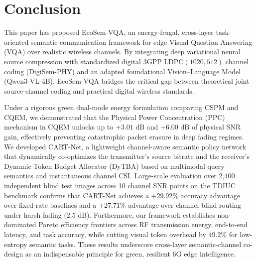\section{Conclusion}\label{sec:conclusion}
This paper has proposed EcoSem-VQA, an energy-frugal, cross-layer task-oriented semantic communication framework for edge Visual Question Answering (VQA) over realistic wireless channels. By integrating deep variational neural source compression with standardized digital 3GPP $\text{LDPC}(1020, 512)$ channel coding (DigiSem-PHY) and an adapted foundational Vision--Language Model (Qwen3-VL-4B), EcoSem-VQA bridges the critical gap between theoretical joint source-channel coding and practical digital wireless standards.

Under a rigorous green dual-mode energy formulation comparing CSPM and CQEM, we demonstrated that the Physical Power Concentration (PPC) mechanism in CQEM unlocks up to $+3.01\text{ dB}$ and $+6.00\text{ dB}$ of physical SNR gain, effectively preventing catastrophic packet erasure in deep fading regimes. We developed CART-Net, a lightweight channel-aware semantic policy network that dynamically co-optimizes the transmitter's source bitrate and the receiver's Dynamic Token Budget Allocator (DyTBA) based on multimodal query semantics and instantaneous channel CSI. Large-scale evaluation over 2,400 independent blind test images across 10 channel SNR points on the TDIUC benchmark confirms that CART-Net achieves a $+29.92\%$ accuracy advantage over fixed-rate baselines and a $+27.71\%$ advantage over channel-blind routing under harsh fading ($2.5\text{ dB}$). Furthermore, our framework establishes non-dominated Pareto efficiency frontiers across RF transmission energy, end-to-end latency, and task accuracy, while cutting visual token overhead by $49.2\%$ for low-entropy semantic tasks. These results underscore cross-layer semantic-channel co-design as an indispensable principle for green, resilient 6G edge intelligence.

